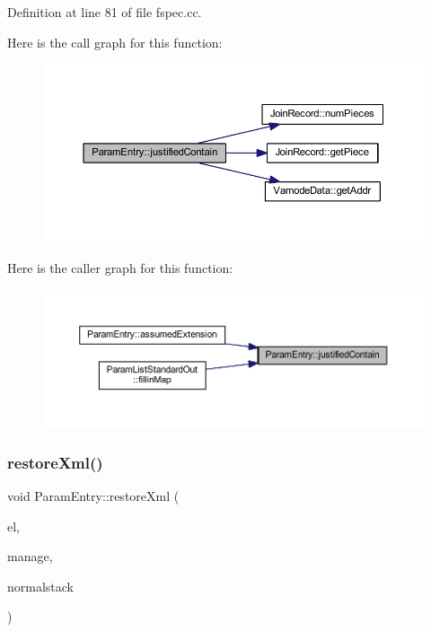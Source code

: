 Definition at line 81 of file fspec.\+cc.

Here is the call graph for this function\+:
\nopagebreak
\begin{figure}[H]
\begin{center}
\leavevmode
\includegraphics[width=350pt]{class_param_entry_ad2394315fdaceeb41f3b67f31f0ef01e_cgraph}
\end{center}
\end{figure}
Here is the caller graph for this function\+:
\nopagebreak
\begin{figure}[H]
\begin{center}
\leavevmode
\includegraphics[width=350pt]{class_param_entry_ad2394315fdaceeb41f3b67f31f0ef01e_icgraph}
\end{center}
\end{figure}
\mbox{\label{class_param_entry_a53c2087cab53baf85ca84cf830146cd4}} 
\subsubsection{\texorpdfstring{restoreXml()}{restoreXml()}}
{\footnotesize\ttfamily void Param\+Entry\+::restore\+Xml (\begin{DoxyParamCaption}\item[{const \mbox{\hyperlink{class_element}{Element}} $\ast$}]{el,  }\item[{const \mbox{\hyperlink{class_addr_space_manager}{Addr\+Space\+Manager}} $\ast$}]{manage,  }\item[{bool}]{normalstack }\end{DoxyParamCaption})}



